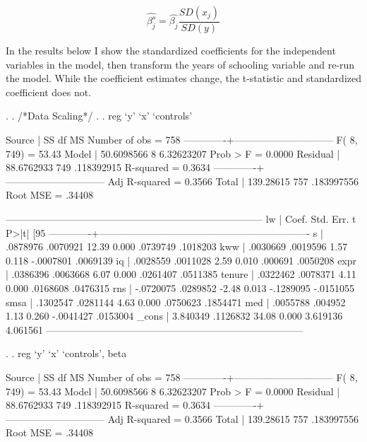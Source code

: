 \documentclass[12pt]{article}
\begin{document}
\begin{equation*}
  \hat{\beta_j^s}=\hat{\beta_j}\frac{SD(x_j)}{SD(y)}
\end{equation*}

In the results below I show the standardized coefficients for the
independent variables in the model, then transform the years of
schooling variable and re-run the model. While the coefficient
estimates change, the t-statistic and standardized coefficient does
not. 

\begin{stlog}
  .   
. /*Data Scaling*/
. 
. reg `y' `x' `controls'

      Source |       SS       df       MS              Number of obs =     758
-------------+------------------------------           F(  8,   749) =   53.43
       Model |  50.6098566     8  6.32623207           Prob > F      =  0.0000
    Residual |  88.6762933   749  .118392915           R-squared     =  0.3634
-------------+------------------------------           Adj R-squared =  0.3566
       Total |   139.28615   757  .183997556           Root MSE      =  .34408

------------------------------------------------------------------------------
          lw |      Coef.   Std. Err.      t    P>|t|     [95%
-------------+----------------------------------------------------------------
           s |   .0878976   .0070921    12.39   0.000     .0739749    .1018203
         kww |   .0030669   .0019596     1.57   0.118    -.0007801    .0069139
          iq |   .0028559   .0011028     2.59   0.010      .000691    .0050208
        expr |   .0386396   .0063668     6.07   0.000     .0261407    .0511385
      tenure |   .0322462   .0078371     4.11   0.000     .0168608    .0476315
         rns |  -.0720075   .0289852    -2.48   0.013    -.1289095   -.0151055
        smsa |   .1302547   .0281144     4.63   0.000     .0750623    .1854471
         med |   .0055788    .004952     1.13   0.260    -.0041427    .0153004
       _cons |   3.840349   .1126832    34.08   0.000     3.619136    4.061561
------------------------------------------------------------------------------

.   
. reg `y' `x' `controls', beta

      Source |       SS       df       MS              Number of obs =     758
-------------+------------------------------           F(  8,   749) =   53.43
       Model |  50.6098566     8  6.32623207           Prob > F      =  0.0000
    Residual |  88.6762933   749  .118392915           R-squared     =  0.3634
-------------+------------------------------           Adj R-squared =  0.3566
       Total |   139.28615   757  .183997556           Root MSE      =  .34408


\end{stlog}
\end{document}
